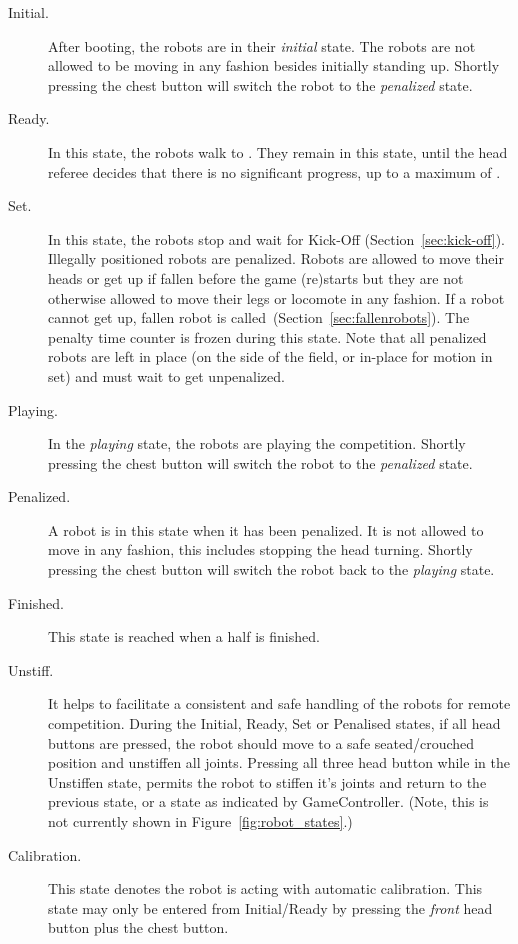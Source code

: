 \begin{description}
	\item[Initial.] After booting, the robots are in their \emph{initial} state. The robots are not allowed to be moving in any fashion besides initially standing up. Shortly pressing the chest button will switch the robot to the \emph{penalized} state.
	
	\item[Ready.] In this state, the robots walk to . They remain in this state, until the head referee decides that there is no significant progress, up to a maximum of \KickOffAutoTime.
	
	\item[Set.] In this state, the robots stop and wait for Kick-Off  (\cf Section~\ref{sec:kick-off}).
	Illegally positioned robots are penalized.
	Robots are allowed to move their heads or get up if fallen before the game (re)starts but they are not otherwise allowed to move their legs or locomote in any fashion.
	If a robot cannot get up, fallen robot is called~(\cf Section~\ref{sec:fallenrobots}).
	The penalty time counter is frozen during this state.
	Note that all penalized robots are left in place (on the side of the field, or in-place for motion in set) and must wait to get unpenalized.
	
	\item[Playing.] In the \emph{playing} state, the robots are playing the competition. Shortly pressing the chest button will switch the robot to the \emph{penalized} state.
	
	\item[Penalized.] A robot is in this state when it has been penalized. It is not allowed to move in any fashion,  this includes stopping the head turning. Shortly pressing the chest button will switch the robot back to the \emph{playing} state.
	
	\item[Finished.] This state is reached when a half is finished.

	\item[Unstiff.]  It helps to facilitate a consistent and safe handling of the robots for remote competition. During the Initial, Ready, Set or Penalised states, if all head buttons are pressed, the robot should move to a safe seated/crouched position and unstiffen all joints. Pressing all three head button while in the Unstiffen state, permits the robot to stiffen it's joints and return to the previous state, or a state as indicated by GameController. (Note, this is not currently shown in Figure~\ref{fig:robot_states}.)


	\item[Calibration.]  This state denotes the robot is acting with automatic calibration. This state may only be entered from Initial/Ready by pressing the \textit{front} head button plus the chest button.
    
\end{description}

